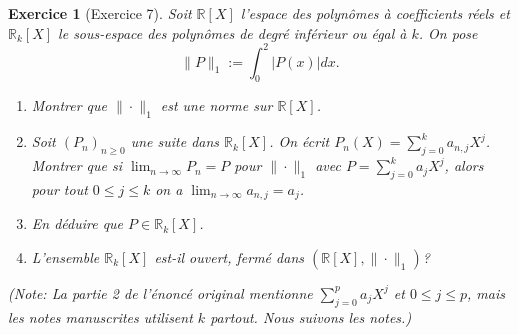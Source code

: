 \documentclass{article}
\newtheorem{exercise}{Exercice} %
\begin{document}
\begin{exercise}[Exercice 7]
Soit $\mathbb{R}[X]$ l'espace des polynômes à coefficients réels et $\mathbb{R}_k[X]$ le sous-espace des polynômes de degré inférieur ou égal à $k$. On pose
\[ \|P\|_1 := \int_0^2 |P(x)| dx. \]
\begin{enumerate}
    \item Montrer que $\| \cdot \|_1$ est une norme sur $\mathbb{R}[X]$.
    \item Soit $(P_n)_{n \ge 0}$ une suite dans $\mathbb{R}_k[X]$. On écrit $P_n(X) = \sum_{j=0}^k a_{n,j} X^j$. Montrer que si $\lim_{n \to \infty} P_n = P$ pour $\| \cdot \|_1$ avec $P = \sum_{j=0}^k a_j X^j$, alors pour tout $0 \le j \le k$ on a $\lim_{n \to \infty} a_{n,j} = a_j$.
    \item En déduire que $P \in \mathbb{R}_k[X]$.
    \item L'ensemble $\mathbb{R}_k[X]$ est-il ouvert, fermé dans $(\mathbb{R}[X], \| \cdot \|_1)$?
\end{enumerate}
(Note: La partie 2 de l'énoncé original mentionne $\sum_{j=0}^p a_j X^j$ et $0 \le j \le p$, mais les notes manuscrites utilisent $k$ partout. Nous suivons les notes.)
\end{exercise}
\end{document}
